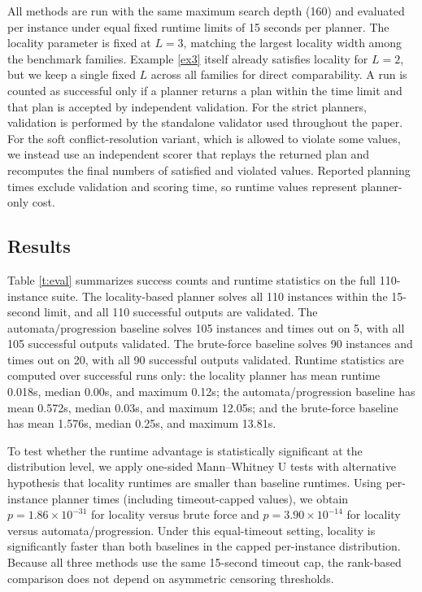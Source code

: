 \documentclass[]{jair}
\begin{document}
All methods are run with the same maximum search depth (160) and evaluated per instance under equal fixed runtime limits of 15 seconds per planner. The locality parameter is fixed at $L=3$, matching the largest locality width among the benchmark families. Example \ref{ex3} itself already satisfies locality for $L=2$, but we keep a single fixed $L$ across all families for direct comparability. A run is counted as successful only if a planner returns a plan within the time limit and that plan is accepted by independent validation. For the strict planners, validation is performed by the standalone validator used throughout the paper. For the soft conflict-resolution variant, which is allowed to violate some values, we instead use an independent scorer that replays the returned plan and recomputes the final numbers of satisfied and violated values. Reported planning times exclude validation and scoring time, so runtime values represent planner-only cost.

\subsection{Results}

Table \ref{t:eval} summarizes success counts and runtime statistics on the full 110-instance suite. The locality-based planner solves all 110 instances within the 15-second limit, and all 110 successful outputs are validated. The automata/progression baseline solves 105 instances and times out on 5, with all 105 successful outputs validated. The brute-force baseline solves 90 instances and times out on 20, with all 90 successful outputs validated. Runtime statistics are computed over successful runs only: the locality planner has mean runtime 0.018s, median 0.00s, and maximum 0.12s; the automata/progression baseline has mean 0.572s, median 0.03s, and maximum 12.05s; and the brute-force baseline has mean 1.576s, median 0.25s, and maximum 13.81s.

To test whether the runtime advantage is statistically significant at the distribution level, we apply one-sided Mann--Whitney U tests with alternative hypothesis that locality runtimes are smaller than baseline runtimes. Using per-instance planner times (including timeout-capped values), we obtain $p=1.86\times 10^{-31}$ for locality versus brute force and $p=3.90\times 10^{-14}$ for locality versus automata/progression. Under this equal-timeout setting, locality is significantly faster than both baselines in the capped per-instance distribution.
Because all three methods use the same 15-second timeout cap, the rank-based comparison does not depend on asymmetric censoring thresholds.
\end{document}
